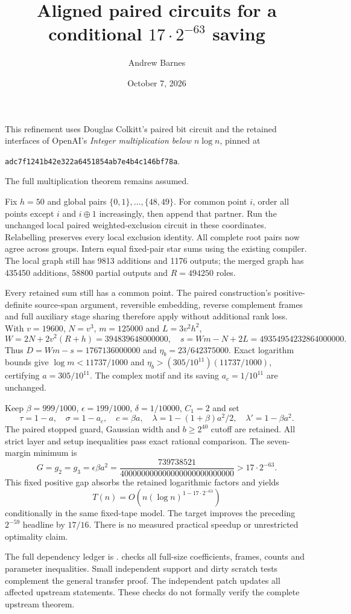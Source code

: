 \documentclass[11pt]{article}
\title{Aligned paired circuits for a conditional $17\cdot2^{-63}$ saving}
\author{Andrew Barnes}
\date{October 7, 2026}
\begin{document}
\maketitle
This refinement uses Douglas Colkitt's paired bit circuit and the retained
interfaces of OpenAI's \emph{Integer multiplication below $n\log n$}, pinned at
\begin{center}\texttt{adc7f1241b42e322a6451854ab7e4b4c146bf78a}.\end{center}
The full multiplication theorem remains assumed.

Fix $h=50$ and global pairs $\{0,1\},\ldots,\{48,49\}$.
For common point $i$, order all points except $i$ and $i\mathbin{\oplus}1$
increasingly, then append that partner. Run the unchanged local paired
weighted-exclusion circuit in these coordinates. Relabelling preserves every
local exclusion identity. All complete root pairs now agree across groups.
Intern equal fixed-pair star sums using the existing compiler.
The local graph still has 9813 additions and 1176 outputs; the merged graph has
435450 additions, 58800 partial outputs and $R=494250$ roles.

Every retained sum still has a common point. The paired construction's
positive-definite source-span argument, reversible embedding, reverse
complement frames and full auxiliary stage sharing therefore apply without
additional rank loss. With $v=19600$, $N=v^3$, $m=125000$ and $L=3v^2h^2$,
\[
 W=2N+2v^2(R+h)=394839648000000,\quad
 s=Wm-N+2L=49354954232864000000.
\]
Thus $D=Wm-s=1767136000000$ and $\eta_b=23/642375000$.
Exact logarithm bounds give $\log m<11737/1000$ and
$\eta_b>(305/10^{11})(11737/1000)$, certifying $a=305/10^{11}$.
The complex motif and its saving $a_c=1/10^{11}$ are unchanged.

Keep $\beta=999/1000$, $\epsilon=199/1000$, $\delta=1/10000$, $C_1=2$ and set
\[
 \tau=1-a,\quad\sigma=1-a_c,\quad c=\beta a,\quad
 \lambda=1-(1+\beta)a^2/2,\quad\lambda'=1-\beta a^2.
\]
The paired stopped guard, Gaussian width and $b\ge2^{40}$ cutoff are retained.
All strict layer and setup inequalities pass exact rational comparison. The
seven-margin minimum is
\[
 G=g_2=g_3=\epsilon\beta a^2
 =\frac{739738521}{400000000000000000000000000}>17\cdot2^{-63}.
\]
This fixed positive gap absorbs the retained logarithmic factors and yields
\[
 T(n)=O(n(\log n)^{1-17\cdot2^{-63}})
\]
conditionally in the same fixed-tape model.
The target improves the preceding $2^{-59}$ headline by $17/16$.
There is no measured practical speedup or unrestricted optimality claim.

The full dependency ledger is .
 checks all full-size coefficients,
frames, counts and parameter inequalities. Small independent support and dirty
scratch tests complement the general transfer proof. The independent patch
 updates all affected upstream statements.
These checks do not formally verify the complete upstream theorem.
\end{document}
